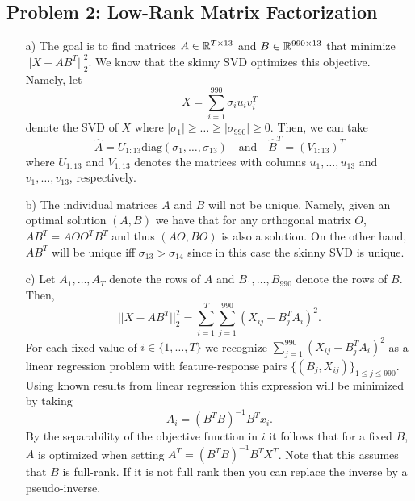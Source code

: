 \subsection*{Problem 2: Low-Rank Matrix Factorization}

\begin{enumerate}
\item[a)]
The goal is to find matrices $A \in \mathbb{R}^{T \times 13}$ and $B \in \mathbb{R}^{990 \times 13}$ that minimize $||X - AB^T||_2^2$. We know that the skinny SVD optimizes this objective. Namely, let
\[
X = \sum_{i=1}^{990} \sigma_i u_i v_i^T
\]
denote the SVD of $X$ where $\vert \sigma_1 \vert \geq \dots \geq \vert \sigma_{990} \vert \geq 0$. Then, we can take 
\[
\hat{A} = U_{1:13}\text{diag}(\sigma_1,\dots, \sigma_{13}) \ \ \ \text{ and } \ \ \ \hat{B}^T =  (V_{1:13})^T
\]
where $U_{1:13}$ and $V_{1:13}$ denotes the matrices with columns $u_1,\dots,u_{13}$ and $v_1,\dots,v_{13}$, respectively.
\item[b)]
The individual matrices $A$ and $B$ will not be unique. Namely, given an optimal solution $(A,B)$ we have that for any orthogonal matrix $O$, $AB^T = AOO^TB^T$ and thus $(AO,BO)$ is also a solution. On the other hand, $AB^T$ will be unique iff $\sigma_{13} > \sigma_{14}$ since in this case the skinny SVD is unique.
\item[c)]
Let $A_1,\dots,A_{T}$ denote the rows of $A$ and $B_1,\dots,B_{990}$ denote the rows of $B$. Then,
\[
||X - AB^T||_2^2 =  \sum_{i=1}^{T}  \sum_{j=1}^{990}   (X_{ij} - B_j^TA_i )^2.
\]
For each fixed value of $i \in \{1,\dots,T\}$ we recognize $ \sum_{j=1}^{990}   (X_{ij} - B_j^TA_i )^2$ as a linear regression problem with feature-response pairs $\{(B_j,X_{ij})\}_{1 \leq  j \leq 990}$. Using known results from linear regression this expression will be minimized by taking
\[
A_i = (B^TB)^{-1}B^Tx_i.
\]
By the separability of the objective function in $i$ it follows that for a fixed $B$, $A$ is optimized when setting $A^T = (B^TB)^{-1} B^T X^T$. Note that this assumes that $B$ is full-rank. If it is not full rank then you can replace the inverse by a pseudo-inverse.


\end{enumerate}
